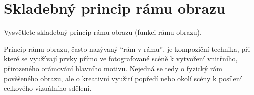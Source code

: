 \section{Skladebný princip rámu obrazu}
Vysvětlete skladebný princip rámu obrazu (funkci rámu obrazu).

Princip rámu obrazu, často nazývaný \enquote{rám v rámu}, je kompoziční technika, při které se využívají 
prvky přímo ve fotografované scéně k vytvoření vnitřního, přirozeného orámování hlavního motivu. Nejedná se tedy o 
fyzický rám pověšeného obrazu, ale o kreativní využití popředí nebo okolí scény k posílení celkového vizuálního sdělení.